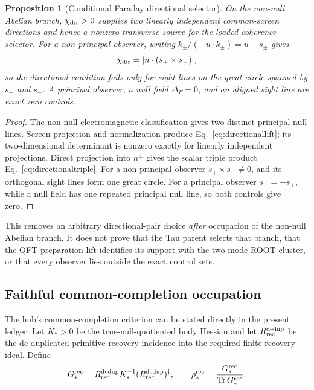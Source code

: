 \documentclass[11pt]{article}
\newtheorem{proposition}{Proposition}
\begin{document}
\begin{proposition}[Conditional Faraday directional selector]
On the non-null Abelian branch, $\chi_{\rm dir}>0$ supplies two linearly
independent common-screen directions and hence a nonzero transverse source
for the loaded coherence selector.  For a non-principal observer, writing
$k_\pm/(-u\cdot k_\pm)=u+s_\pm$ gives
\begin{equation}
\chi_{\rm dir}=|n\cdot(s_+\times s_-)|,
\label{eq:directionaltriple}
\end{equation}
so the directional condition fails only for sight lines on the great circle
spanned by $s_+$ and $s_-$.  A principal observer, a null field
$\Delta_F=0$, and an aligned sight line are exact zero controls.
\end{proposition}

\begin{proof}
The non-null electromagnetic classification gives two distinct principal
null lines.  Screen projection and normalization produce
Eq.~\eqref{eq:directionallift}; its two-dimensional determinant is nonzero
exactly for linearly independent projections.  Direct projection into
$n^\perp$ gives the scalar triple product
Eq.~\eqref{eq:directionaltriple}.  For a non-principal observer
$s_+\times s_-\neq0$, and its orthogonal sight lines form one great circle.
For a principal observer $s_-=-s_+$, while a null field has one repeated
principal null line, so both controls give zero.
\end{proof}

This removes an arbitrary directional-pair choice \emph{after} occupation of
the non-null Abelian branch.  It does not prove that the Tau parent selects
that branch, that the QFT preparation lift identifies its support with the
two-mode ROOT cluster, or that every observer lies outside the exact control
sets.

\subsection{Faithful common-completion occupation}

The hub's common-completion criterion can be stated directly in the present
ledger.  Let $K_*>0$ be the true-null-quotiented body Hessian and let
$R_{\rm rec}^{\rm dedup}$ be the de-duplicated primitive recovery incidence
into the required finite recovery ideal.  Define
\begin{equation}
G_*^{\rm rec}=R_{\rm rec}^{\rm dedup}K_*^{-1}
(R_{\rm rec}^{\rm dedup})^\dagger,
\qquad
\rho_*^{\rm rec}={G_*^{\rm rec}\over\operatorname{Tr}G_*^{\rm rec}}.
\label{eq:faithfulcompletion}
\end{equation}
\end{document}

